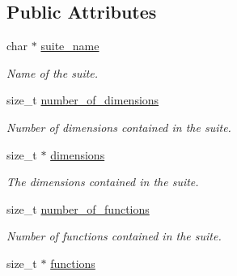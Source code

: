\subsection*{Public Attributes}
\begin{DoxyCompactItemize}
\item 
char $\ast$ \hyperlink{structcoco__suite__s_a0a9f4d18bcc75d6139fc93bb613835e6}{suite\+\_\+name}\hypertarget{structcoco__suite__s_a0a9f4d18bcc75d6139fc93bb613835e6}{}\label{structcoco__suite__s_a0a9f4d18bcc75d6139fc93bb613835e6}

\begin{DoxyCompactList}\small\item\em Name of the suite. \end{DoxyCompactList}\item 
size\+\_\+t \hyperlink{structcoco__suite__s_aa3ace62df46f007cd5f61521b0e536d1}{number\+\_\+of\+\_\+dimensions}\hypertarget{structcoco__suite__s_aa3ace62df46f007cd5f61521b0e536d1}{}\label{structcoco__suite__s_aa3ace62df46f007cd5f61521b0e536d1}

\begin{DoxyCompactList}\small\item\em Number of dimensions contained in the suite. \end{DoxyCompactList}\item 
size\+\_\+t $\ast$ \hyperlink{structcoco__suite__s_a97bfdfa05fea85bf1ba66680eb2e39b2}{dimensions}\hypertarget{structcoco__suite__s_a97bfdfa05fea85bf1ba66680eb2e39b2}{}\label{structcoco__suite__s_a97bfdfa05fea85bf1ba66680eb2e39b2}

\begin{DoxyCompactList}\small\item\em The dimensions contained in the suite. \end{DoxyCompactList}\item 
size\+\_\+t \hyperlink{structcoco__suite__s_a552bfa9971ee92347632a87d7e93cde9}{number\+\_\+of\+\_\+functions}\hypertarget{structcoco__suite__s_a552bfa9971ee92347632a87d7e93cde9}{}\label{structcoco__suite__s_a552bfa9971ee92347632a87d7e93cde9}

\begin{DoxyCompactList}\small\item\em Number of functions contained in the suite. \end{DoxyCompactList}\item 
size\+\_\+t $\ast$ \hyperlink{structcoco__suite__s_ad0bfaeb6db02694860d265f63765ae27}{functions}\hypertarget{structcoco__suite__s_ad0bfaeb6db02694860d265f63765ae27}{}\label{structcoco__suite__s_ad0bfaeb6db02694860d265f63765ae27}


\end{DoxyCompactItemize}
